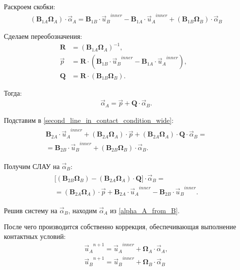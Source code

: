 Раскроем скобки:
\begin{eqnarray}
	(\mathbf{B}_{1A} \mathbf{\Omega}_A) \cdot  \vec{\alpha}_A = \mathbf{B}_{1B} \cdot {\vec{u}_B}^{inner} - \mathbf{B}_{1A} \cdot {\vec{u}_A}^{inner} + (\mathbf{B}_{1B} \mathbf{\Omega}_B) \cdot \vec{\alpha}_B
\end{eqnarray}

Сделаем переобозначения:
\begin{align}
\label{matrixRcontact}
\mathbf{R} &= (\mathbf{B}_{1A} \mathbf{\Omega}_A)^{-1}, &\\
\vec{p} &= \mathbf{R} \cdot (\mathbf{B}_{1B} \cdot {\vec{u}_B}^{inner} - \mathbf{B}_{1A} \cdot {\vec{u}_A}^{inner}), &\\
\mathbf{Q} &= \mathbf{R} \cdot (\mathbf{B}_{1B} \mathbf{\Omega}_B).
\end{align}

Тогда:
\begin{eqnarray}
\label{alpha_A_from_B}
\vec{\alpha}_A = \vec{p} + \mathbf{Q} \cdot \vec{\alpha}_B.
\end{eqnarray}

Подставим в \eqref{second_line_in_contact_condition_wide}:
\begin{eqnarray}
\begin{split}
\mathbf{B}_{2A} \cdot {\vec{u}_A}^{inner} + (\mathbf{B}_{2A} \mathbf{\Omega}_A) \cdot \vec{p} + (\mathbf{B}_{2A} \mathbf{\Omega}_A) \cdot \mathbf{Q} \cdot \vec{\alpha}_B = \\ =
\mathbf{B}_{2B} \cdot {\vec{u}_B}^{inner} + (\mathbf{B}_{2B} \mathbf{\Omega}_B) \cdot \vec{\alpha}_B.
\end{split}
\end{eqnarray}

Получим СЛАУ на $\vec{\alpha}_B$:
\begin{eqnarray}
\label{SLE_on_alphaB}
\begin{split}
\Bigg[  (\mathbf{B}_{2B} \mathbf{\Omega}_B) - (\mathbf{B}_{2A} \mathbf{\Omega}_A) \cdot \mathbf{Q}  \Bigg] \cdot \vec{\alpha}_B = \\ = 
(\mathbf{B}_{2A} \mathbf{\Omega}_A) \cdot \vec{p} + \mathbf{B}_{2A} \cdot {\vec{u}_A}^{inner} - \mathbf{B}_{2B} \cdot {\vec{u}_B}^{inner}.
\end{split}
\end{eqnarray}

Решив систему на $\vec{\alpha}_B$, находим $\vec{\alpha}_A$ из \eqref{alpha_A_from_B}.

После чего производится собственно коррекция, обеспечивающая выполнение контактных условий:
\begin{eqnarray}
{\vec{u}_A}^{n+1} = {\vec{u}_A}^{inner} + \mathbf{\Omega}_A \cdot \vec{\alpha}_A, \\
{\vec{u}_B}^{n+1} = {\vec{u}_B}^{inner} + \mathbf{\Omega}_B \cdot \vec{\alpha}_B
\end{eqnarray}


